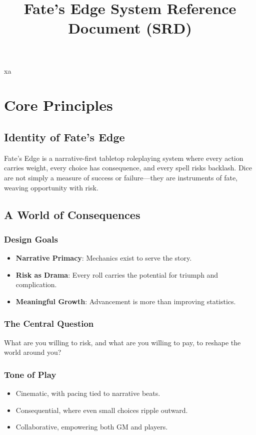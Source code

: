 \documentclass[11pt]{article}
\title{Fate's Edge System Reference Document (SRD)}
\author{}
\date{}
\begin{document}
\maketitle
\tableofcontents
\newpage
xa
\section{Core Principles}

\subsection{Identity of Fate's Edge}
Fate's Edge is a narrative-first tabletop roleplaying system where every action carries weight, every choice has consequence, and every spell risks backlash. Dice are not simply a measure of success or failure—they are instruments of fate, weaving opportunity with risk.

\subsection{A World of Consequences}

\subsubsection{Design Goals}
\begin{itemize}
    \item \textbf{Narrative Primacy}: Mechanics exist to serve the story.
    \item \textbf{Risk as Drama}: Every roll carries the potential for triumph and complication.
    \item \textbf{Meaningful Growth}: Advancement is more than improving statistics.
\end{itemize}

\subsubsection{The Central Question}
What are you willing to risk, and what are you willing to pay, to reshape the world around you?

\subsubsection{Tone of Play}
\begin{itemize}
    \item Cinematic, with pacing tied to narrative beats.
    \item Consequential, where even small choices ripple outward.
    \item Collaborative, empowering both GM and players.
\end{itemize}
\end{document}
